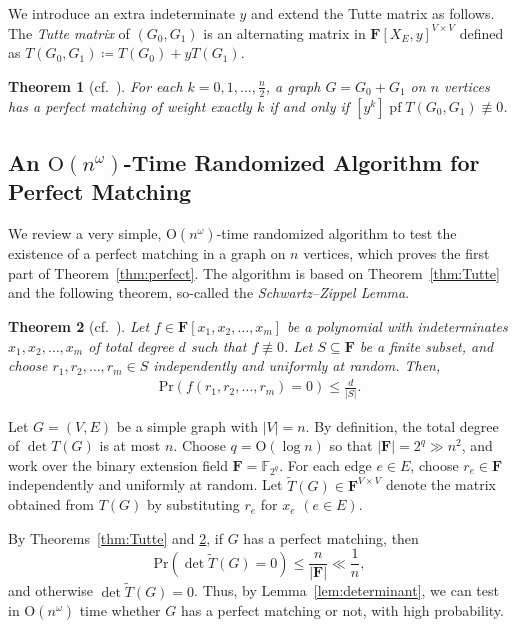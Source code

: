 \documentclass[11pt, a4paper]{article}
\theoremstyle{plain}
\newtheorem{theorem}{Theorem}[section]
\theoremstyle{definition}
\theoremstyle{remark}
\newcommand{\bF}{\mathbf{F}}
\DeclareMathOperator{\pf}{pf}
\begin{document}
We introduce an extra indeterminate $y$ and extend the Tutte matrix as follows.
The \emph{Tutte matrix} of $(G_0, G_1)$ is an alternating matrix in $\bF[X_E, y]^{V \times V}$ defined as $T(G_0, G_1) \coloneqq T(G_0) + yT(G_1)$.

\begin{theorem}[cf.~\cite{MVV1987, CGM1992}]\label{thm:MVV}
    For each $k = 0, 1, \dots, \frac{n}{2}$, a graph $G = G_0 + G_1$ on $n$ vertices has a perfect matching of weight exactly $k$ if and only if $[y^k]\pf T(G_0, G_1) \not\equiv 0$.
\end{theorem}



\subsection{An $\mathrm{O}(n^\omega)$-Time Randomized Algorithm for Perfect Matching}\label{sec:PM}
We review a very simple, $\mathrm{O}(n^\omega)$-time randomized algorithm to test the existence of a perfect matching in a graph on $n$ vertices, which proves the first part of Theorem~\ref{thm:perfect}.
The algorithm is based on Theorem~\ref{thm:Tutte} and the following theorem, so-called the \emph{Schwartz--Zippel Lemma}.

\begin{theorem}[cf.~{\cite[Theorem~7.2]{MR1995}}]\label{thm:SZ}
    Let $f \in \bF[x_1, x_2, \dots, x_m]$ be a polynomial with indeterminates $x_1, x_2, \dots, x_m$ of total degree $d$ such that $f \not\equiv 0$.
    Let $S \subseteq \bF$ be a finite subset, and choose $r_1, r_2, \dots, r_m \in S$ independently and uniformly at random.
    Then, 
    \begin{align*}
        \mathrm{Pr}\left(f(r_1, r_2, \dots, r_m) = 0\right) \le \frac{d}{|S|}.
    \end{align*}
\end{theorem}

Let $G = (V, E)$ be a simple graph with $|V| = n$.
By definition, the total degree of $\det T(G)$ is at most $n$.
Choose $q = \mathrm{O}(\log n)$ so that $|\bF|=2^q \gg n^2$, and work over the binary extension field $\bF=\mathbb{F}_{2^q}$.
For each edge $e \in E$, choose $r_e \in \bF$ independently and uniformly at random.
Let $\tilde{T}(G) \in \bF^{V \times V}$ denote the matrix obtained from $T(G)$ by substituting $r_e$ for $x_e$ $(e \in E)$.

By Theorems~\ref{thm:Tutte} and \ref{thm:SZ}, if $G$ has a perfect matching, then
\[\mathrm{Pr}\left(\det \tilde{T}(G) = 0\right) \le \frac{n}{|\bF|} \ll \frac{1}{n},\]
and otherwise $\det \tilde{T}(G) = 0$.
Thus, by Lemma~\ref{lem:determinant}, we can test in $\mathrm{O}(n^\omega)$ time whether $G$ has a perfect matching or not, with high probability.
\end{document}
